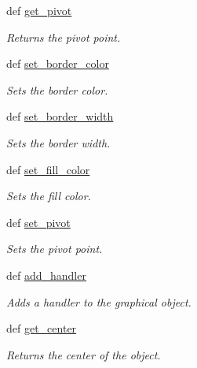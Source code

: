\begin{DoxyCompactItemize}
def \hyperlink{classcs110graphics_1_1Fillable_a514fa0d21297c1372681afae9219fd58}{get\_\-pivot}
\begin{DoxyCompactList}\small\item\em Returns the pivot point. \item\end{DoxyCompactList}\item 
def \hyperlink{classcs110graphics_1_1Fillable_a2f830be5d970faac97759910d20d68a4}{set\_\-border\_\-color}
\begin{DoxyCompactList}\small\item\em Sets the border color. \item\end{DoxyCompactList}\item 
def \hyperlink{classcs110graphics_1_1Fillable_a09f05462cb2ed38fdccb244340f05b2b}{set\_\-border\_\-width}
\begin{DoxyCompactList}\small\item\em Sets the border width. \item\end{DoxyCompactList}\item 
def \hyperlink{classcs110graphics_1_1Fillable_a4f24c7186c8d057e42a0209eb1d56be7}{set\_\-fill\_\-color}
\begin{DoxyCompactList}\small\item\em Sets the fill color. \item\end{DoxyCompactList}\item 
def \hyperlink{classcs110graphics_1_1Fillable_a2a6066d1a11c0854ff5ee85e7d9ceb54}{set\_\-pivot}
\begin{DoxyCompactList}\small\item\em Sets the pivot point. \item\end{DoxyCompactList}\item 
def \hyperlink{classcs110graphics_1_1GraphicalObject_adb1af0d5a6baae3f9a08d21a3227c49f}{add\_\-handler}
\begin{DoxyCompactList}\small\item\em Adds a handler to the graphical object. \item\end{DoxyCompactList}\item 
def \hyperlink{classcs110graphics_1_1GraphicalObject_a062789c4cc9de38af32dcc4ff2058607}{get\_\-center}
\begin{DoxyCompactList}\small\item\em Returns the center of the object. \item\end{DoxyCompactList}\item 

\end{DoxyCompactItemize}
